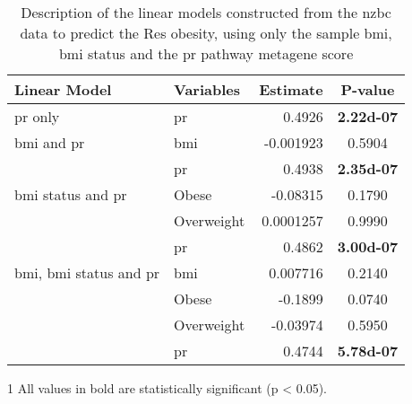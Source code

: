 	\begin{table}[htpb]
		\centering
		\caption[Description of the linear models constructed from the \gls{nzbc} data to predict the Res obesity, using only the sample \gls{bmi}, \gls{bmi} status and the \acrshort{pr} pathway metagene score]{Description of the linear models constructed from the \gls{nzbc} data to predict the Res obesity, using only the sample \gls{bmi}, \gls{bmi} status and the \gls{pr} pathway metagene score}
		\label{tab:lm_pr_only_res}
		\begin{threeparttable}
			\begin{tabular}{llrc}
				Linear Model & Variables & Estimate & {P-value}\\
					\hline
					\hline
					\rule{0pt}{2.25ex}\gls{pr} only                            & \gls{pr}   & 0.4926    & \bfseries \num{2.22d-07} \tnote{1}\\
					\hline
					\rule{0pt}{2.25ex}\gls{bmi} and \gls{pr}                   & \gls{bmi}  & -0.001923 & 0.5904   \\
                                                                               & \gls{pr}   & 0.4938    & \bfseries \num{2.35d-07} \\
					\hline
					\rule{0pt}{2.25ex}\gls{bmi} status and \gls{pr}            & Obese      & -0.08315  & 0.1790   \\
                                                                               & Overweight & 0.0001257 & 0.9990   \\
                                                                               & \gls{pr}   & 0.4862    & \bfseries \num{3.00d-07} \\
					\hline
					\rule{0pt}{2.25ex}\gls{bmi}, \gls{bmi} status and \gls{pr} & \gls{bmi}  & 0.007716  & 0.2140   \\
                                                                               & Obese      & -0.1899   & 0.0740   \\
                                                                               & Overweight & -0.03974  & 0.5950   \\
                                                                               & \gls{pr}   & 0.4744    & \bfseries \num{5.78d-07} \\
					\hline
					\hline
			\end{tabular}
				\begin{tablenotes}
					\begin{footnotesize}
					\item [1] All values in bold are statistically significant (p \textless{} 0.05).
					\end{footnotesize}
				\end{tablenotes}
		\end{threeparttable}
	\end{table}

